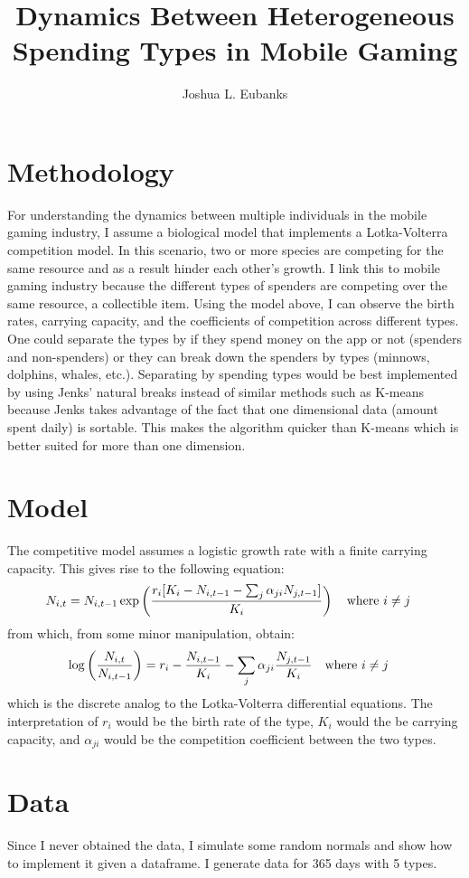\documentclass{paper}
\title{Dynamics Between Heterogeneous Spending Types in Mobile Gaming}
\author{Joshua L. Eubanks}
\begin{document}
\maketitle
\begin{doublespacing}
\section*{Methodology}
For understanding the dynamics between multiple individuals in the mobile gaming industry, I assume a biological model that implements a Lotka-Volterra competition model. In this scenario, two or more species are competing for the same resource and as a result hinder each other's growth. I link this to mobile gaming industry because the different types of spenders are competing over the same resource, a collectible item. Using the model above, I can observe the birth rates, carrying capacity, and the coefficients of competition across different types. One could separate the types by if they spend money on the app or not (spenders and non-spenders) or they can break down the spenders by types (minnows, dolphins, whales, etc.). Separating by spending types would be best implemented by using Jenks' natural breaks instead of similar methods such as K-means because Jenks takes advantage of the fact that one dimensional data (amount spent daily) is sortable. This makes the algorithm quicker than K-means which is better suited for more than one dimension.

\section*{Model}
The competitive model assumes a logistic growth rate with a finite carrying capacity. This gives rise to the following equation:
\begin{align*}
N_{i,t} &= N_{i,t-1}\exp\left(\frac{r_{i}[K_{i}-N_{i,t-1}-\sum_{j}\alpha_{ji}N_{j,t-1}]}{K_{i}}\right) \text{\quad where } i \neq j
\end{align*} 
from which, from some minor manipulation, obtain:
\begin{align*}
\log\left(\frac{N_{i,t}}{N_{i,t-1}}\right) &= r_{i} - \frac{N_{i,t-1}}{K_{i}} - \sum_{j}\alpha_{ji}\frac{N_{j,t-1}}{K_{i}} \text{\quad where } i \neq j
\end{align*}
which is the discrete analog to the Lotka-Volterra differential equations. The interpretation of $r_{i}$ would be the birth rate of the type, $K_{i}$ would the be carrying capacity, and $\alpha_{ji}$ would be the competition coefficient between the two types.
 
\section*{Data}
Since I never obtained the data, I simulate some random normals and show how to implement it given a dataframe. I generate data for 365 days with 5 types.

\end{doublespacing}
\nocite{*}



\end{document}
